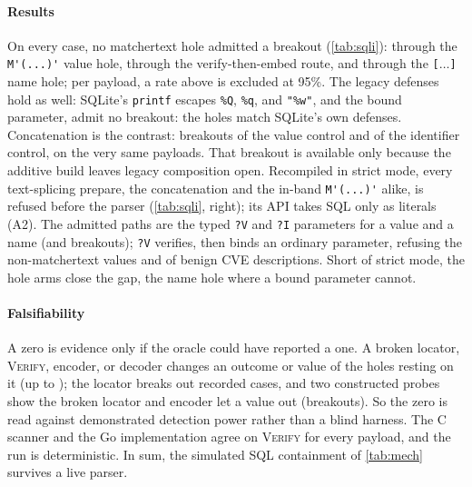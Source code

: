 \paragraph{Results}
On every case, no matchertext hole admitted a breakout (\cref{tab:sqli}):
\dataSqliMtBreakout through the \verb|M'(...)'| value hole, \dataSqliMtStrictBreakout
through the verify-then-embed route, and \dataSqliIdentMtBreakout through the
\verb|[|$\dots$\verb|]| name hole; per payload, a rate above
\dataSqliZeroBound is excluded at 95\%.
The legacy defenses hold as well: SQLite's \texttt{printf} escapes \texttt{\%Q},
\texttt{\%q}, and \texttt{"\%w"}, and the bound parameter, admit no breakout:
the holes match SQLite's own defenses.
Concatenation is the contrast: \dataSqliConcatBreakout breakouts of the value
control and \dataSqliIdentConcatBreakout of the identifier control, on the very
same payloads.
That breakout is available only because the additive build leaves legacy
composition open. Recompiled in strict mode, every text-splicing prepare, the
concatenation and the in-band \verb|M'(...)'| alike, is refused before the parser
(\cref{tab:sqli}, right); its API takes SQL only as literals (A2).
The admitted paths are the typed \texttt{?V} and
\texttt{?I} parameters for a value and a name (\dataSqliStrictValueBreakout and
\dataSqliStrictIdentBreakout breakouts); \texttt{?V} verifies, then binds an
ordinary parameter, refusing the \dataSqliStrictValueRejected non-matchertext values
and \dataSqliBenignRejectedShare of benign CVE descriptions.
Short of strict mode, the hole arms close the gap, the name hole where a bound
parameter cannot.

\paragraph{Falsifiability}
A zero is evidence only if the oracle could have reported a one.
A broken locator, \textsc{Verify}, encoder, or decoder changes an outcome or
value of the holes resting on it (up to \dataSqliSabotageDetect); the locator
breaks out \dataSqliSabotageBreakouts recorded cases, and two constructed probes
show the broken locator and encoder let a value out
(\dataSqliSabotageProbeBreakouts breakouts). So the
zero is read against demonstrated detection power rather than a blind harness.
The C scanner and the Go implementation agree on \textsc{Verify} for
every payload, and the run is deterministic.
In sum, the simulated SQL containment of \cref{tab:mech} survives a live parser.

